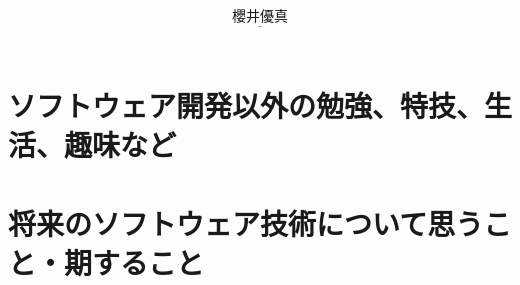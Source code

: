 \documentclass[11pt,onecolumn]{jsarticle}
\begin{document}
\[
  \underline{櫻井優真}
\]\\

\section{ソフトウェア開発以外の勉強、特技、生活、趣味など}
\section{将来のソフトウェア技術について思うこと・期すること}


\end{document}
